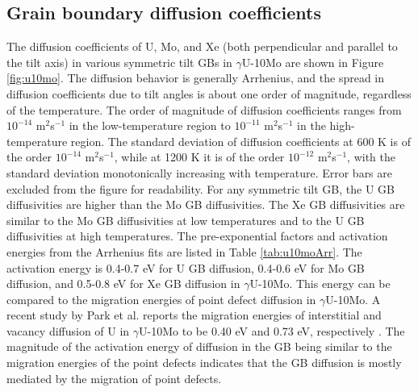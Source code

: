 \documentclass{elsarticle}
\begin{document}
\FloatBarrier
\subsection{Grain boundary diffusion coefficients}

The diffusion coefficients of U, Mo, and Xe (both perpendicular and parallel to the tilt axis) in various symmetric tilt GBs in $\gamma$U-10Mo are shown in Figure \ref{fig:u10mo}. The diffusion behavior is generally Arrhenius, and the spread in diffusion coefficients due to tilt angles is about one order of magnitude, regardless of the temperature. The order of magnitude of diffusion coefficients ranges from $10^{-14}$ m$^2$s$^{-1}$ in the low-temperature region to $10^{-11}$ m$^2$s$^{-1}$ in the high-temperature region. The standard deviation of diffusion coefficients at 600 K is of the order $10^{-14}$ m$^2$s$^{-1}$, while at 1200 K it is of the order $10^{-12}$ m$^2$s$^{-1}$, with the standard deviation monotonically increasing with temperature. Error bars are excluded from the figure for readability. For any symmetric tilt GB, the U GB diffusivities are higher than the Mo GB diffusivities. The Xe GB diffusivities are similar to the Mo GB diffusivities at low temperatures and to the U GB diffusivities at high temperatures. The pre-exponential factors and activation energies from the Arrhenius fits are listed in Table \ref{tab:u10moArr}. The activation energy is 0.4-0.7 eV for U GB diffusion, 0.4-0.6 eV for Mo GB diffusion, and 0.5-0.8 eV for Xe GB diffusion in $\gamma$U-10Mo. This energy can be compared to the migration energies of point defect diffusion in $\gamma$U-10Mo. A recent study by Park et al. reports the migration energies of interstitial and vacancy diffusion of U in $\gamma$U-10Mo to be 0.40 eV and 0.73 eV, respectively \cite{park2023}. The magnitude of the activation energy of diffusion in the GB being similar to the migration energies of the point defects indicates that the GB diffusion is mostly mediated by the migration of point defects.
\end{document}
